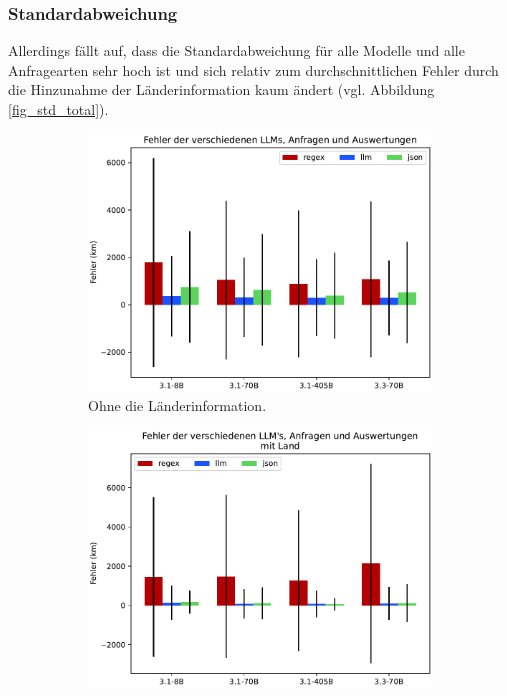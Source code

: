 \subsubsection*{Standardabweichung}
Allerdings fällt auf, dass die Standardabweichung für alle Modelle und alle Anfragearten sehr hoch ist und sich relativ zum durchschnittlichen Fehler durch die Hinzunahme der Länderinformation kaum ändert (vgl. Abbildung \ref{fig_std_total}).

\begin{figure} %
    \centering
    \begin{subfigure}{.5\textwidth}
      \centering
      \includegraphics[width=.95\linewidth]{img/size_template_error.pdf}
      \caption{Ohne die Länderinformation.}
      \label{fig_std_without_country}
    \end{subfigure}%
    \begin{subfigure}{.5\textwidth}
      \centering
      \includegraphics[width=.95\linewidth]{img/country_error.pdf}

\end{subfigure}
\end{figure}
